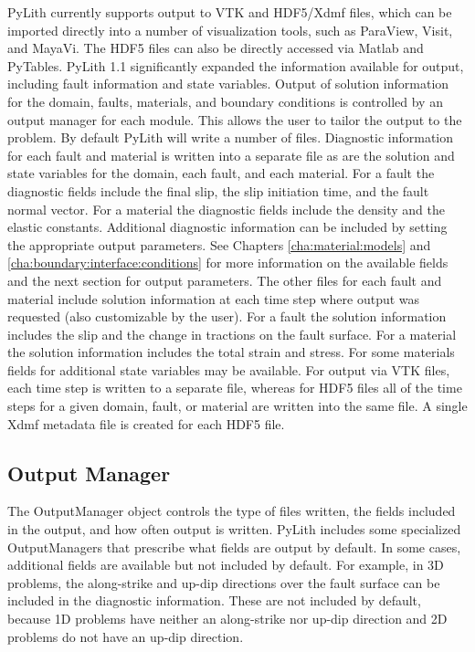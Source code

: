 PyLith currently supports output to VTK and HDF5/Xdmf files, which
can be imported directly into a number of visualization tools, such
as ParaView, Visit, and MayaVi. The HDF5 files can also be directly
accessed via Matlab and PyTables. PyLith 1.1 significantly expanded
the information available for output, including fault information
and state variables. Output of solution information for the domain,
faults, materials, and boundary conditions is controlled by an output
manager for each module. This allows the user to tailor the output
to the problem. By default PyLith will write a number of files. Diagnostic
information for each fault and material is written into a separate
file as are the solution and state variables for the domain, each
fault, and each material. For a fault the diagnostic fields include
the final slip, the slip initiation time, and the fault normal vector.
For a material the diagnostic fields include the density and the elastic
constants. Additional diagnostic information can be included by setting
the appropriate output parameters. See Chapters \vref{cha:material:models}
and \vref{cha:boundary:interface:conditions} for more information
on the available fields and the next section for output parameters.
The other files for each fault and material include solution information
at each time step where output was requested (also customizable by
the user). For a fault the solution information includes the slip
and the change in tractions on the fault surface. For a material the
solution information includes the total strain and stress. For some
materials fields for additional state variables may be available.
For output via VTK files, each time step is written to a separate
file, whereas for HDF5 files all of the time steps for a given domain,
fault, or material are written into the same file. A single Xdmf metadata
file is created for each HDF5 file.


\subsection{Output Manager}

The OutputManager object controls the type of files written, the fields
included in the output, and how often output is written. PyLith includes
some specialized OutputManagers that prescribe what fields are output
by default. In some cases, additional fields are available but not
included by default. For example, in 3D problems, the along-strike
and up-dip directions over the fault surface can be included in the
diagnostic information. These are not included by default, because
1D problems have neither an along-strike nor up-dip direction and
2D problems do not have an up-dip direction.


